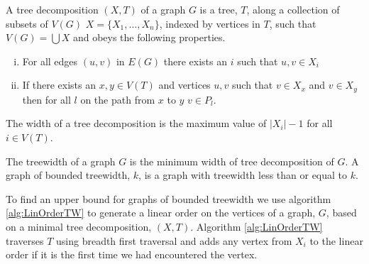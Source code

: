 %    
%    
%    
%    
%    
%
%    

\begin{definition}
    A tree decomposition $(X,T)$ of a graph $G$ is a tree, $T$, along a collection of subsets of $V(G)$ $X=\{X_1,\dots,X_n\}$, indexed by vertices in $T$, such that $V(G)=\bigcup X$ and obeys the following properties.
    \begin{enumerate}[(i)]
        \item For all edges $(u,v)$ in $E(G)$ there exists an $i$ such that $u,v\in X_i$
        \item  If there exists an $x,y\in V(T)$ and vertices $u,v$ such that $v\in X_x$ and $v\in X_y$ then for all $l$ on the path from $x$ to $y$ $v\in P_l$.
    \end{enumerate} 
    The width of a tree decomposition is the maximum value of $|X_i| -1$ for all $i\in V(T)$.
\end{definition}

\begin{definition}[Treewidth]
    The treewidth of a graph $G$ is the minimum width of tree decomposition of $G$.    
    A graph of bounded treewidth, $k$, is a graph with treewidth less than or equal to $k$. 
\end{definition}

To find an upper bound for graphs of bounded treewidth we use algorithm \ref{alg:LinOrderTW} to generate a linear order on the vertices of a graph, $G$, based on a minimal tree decomposition, $(X,T)$. Algorithm \ref{alg:LinOrderTW} traverses $T$ using breadth first traversal and adds any vertex from $X_i$ to the linear order if it is the first time we  had encountered the vertex.

